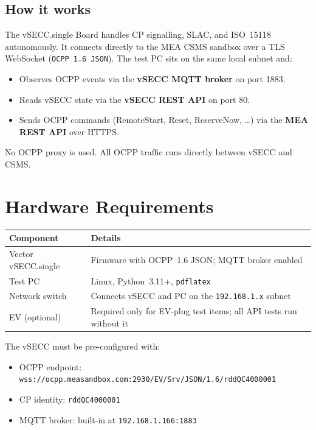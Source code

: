 \documentclass[11pt, a4paper]{article}
\begin{document}
\subsection{How it works}

The vSECC.single Board handles CP signalling, SLAC, and ISO~15118
autonomously. It connects directly to the MEA CSMS sandbox over a TLS
WebSocket (\texttt{OCPP~1.6~JSON}). The test PC sits on the same local
subnet and:
\begin{itemize}[nosep]
  \item Observes OCPP events via the \textbf{vSECC MQTT broker} on port 1883.
  \item Reads vSECC state via the \textbf{vSECC REST API} on port 80.
  \item Sends OCPP commands (RemoteStart, Reset, ReserveNow, \ldots) via the
        \textbf{MEA REST API} over HTTPS.
\end{itemize}

No OCPP proxy is used. All OCPP traffic runs directly between vSECC and CSMS.

\section{Hardware Requirements}

\begin{tabular}{L{4cm} L{10cm}}
\toprule
\textbf{Component} & \textbf{Details} \\
\midrule
Vector vSECC.single & Firmware with OCPP~1.6 JSON; MQTT broker enabled \\
Test PC             & Linux, Python~3.11+, \texttt{pdflatex} \\
Network switch      & Connects vSECC and PC on the \texttt{192.168.1.x} subnet \\
EV (optional)       & Required only for EV-plug test items; all API tests run without it \\
\bottomrule
\end{tabular}

\bigskip
The vSECC must be pre-configured with:
\begin{itemize}[nosep]
  \item OCPP endpoint: \texttt{wss://ocpp.measandbox.com:2930/EV/Srv/JSON/1.6/rddQC4000001}
  \item CP identity: \texttt{rddQC4000001}
  \item MQTT broker: built-in at \texttt{192.168.1.166:1883}
\end{itemize}
\end{document}
